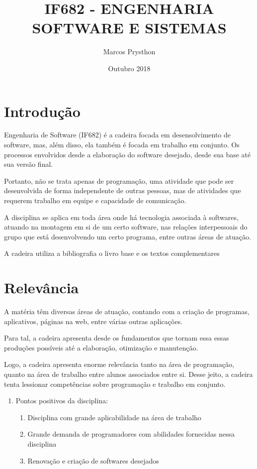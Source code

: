 \documentclass{article}
\title{IF682 - ENGENHARIA SOFTWARE E SISTEMAS}
\author{Marcos Prysthon}
\date{Outubro 2018}
\begin{document}
\maketitle

\section{Introdução}
Engenharia de Software (IF682) é a cadeira focada em desensolvimento de software, mas, além disso, ela também é focada em trabalho em conjunto. Os processos envolvidos desde a elaboração do software desejado, desde sua base até sua versão final.

Portanto, não se trata apenas de programação, uma atividade que pode ser desenvolvida de forma independente de outras pessoas, mas de atividades que requerem trabalho em equipe e capacidade de comunicação.

A disciplina se aplica em toda área onde há tecnologia associada à softwares, atuando na montagem em si de um certo software, nas relações interpessoais do grupo que está desenvolvendo um certo programa, entre outras áreas de atuação.

A cadeira utiliza a bibliografia o livro base\cite{IanSommerville} e os textos complementares \cite{CarloGhezzi} \cite{AlainAbran} \cite{ShariPfleeger}

\section{Relevância}
A matéria têm diversas áreas de atuação, contando com a criação de programas, aplicativos, páginas na web, entre várias outras aplicações.

Para tal, a cadeira apresenta desde os fundamentos que tornam essa essas produções possíveis até a elaboração, otimização e manutenção.

Logo, a cadeira apresenta enorme relevância tanto na área de programação, quanto na área de trabalho entre alunos associados entre si. Desse jeito, a cadeira tenta lessionar competências sobre programação e trabalho em conjunto.

\begin{enumerate}
    \item Pontos positivos da disciplina:
\begin{enumerate}
    \item Disciplina com grande aplicabilidade na área de trabalho
    \item Grande demanda de programadores com abilidades fornecidas nessa disciplina
    \item Renovação e criação de softwares desejados 
    \end{enumerate}
\end{enumerate}
\end{document}
